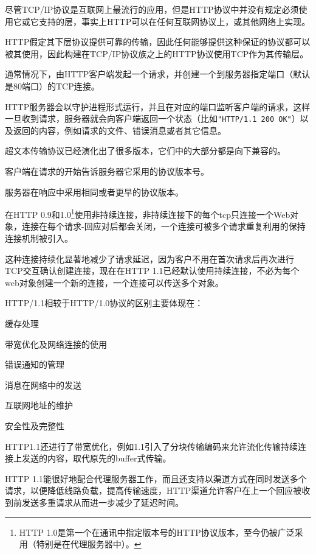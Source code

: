尽管TCP/IP协议是互联网上最流行的应用，但是HTTP协议中并没有规定必须使用它或它支持的层，事实上HTTP可以在任何互联网协议上，或其他网络上实现。

HTTP假定其下层协议提供可靠的传输，因此任何能够提供这种保证的协议都可以被其使用，因此构建在TCP/IP协议族之上的HTTP协议使用TCP作为其传输层。

通常情况下，由HTTP客户端发起一个请求，并创建一个到服务器指定端口（默认是80端口）的TCP连接。

HTTP服务器会以守护进程形式运行，并且在对应的端口监听客户端的请求，这样一旦收到请求，服务器就会向客户端返回一个状态（比如\texttt{"HTTP/1.1 200 OK"}）以及返回的内容，例如请求的文件、错误消息或者其它信息。


超文本传输协议已经演化出了很多版本，它们中的大部分都是向下兼容的。

\begin{compactitem}
\item 客户端在请求的开始告诉服务器它采用的协议版本号。

\item 服务器在响应中采用相同或者更早的协议版本。
\end{compactitem}


在HTTP 0.9和1.0\footnote{HTTP 1.0是第一个在通讯中指定版本号的HTTP协议版本，至今仍被广泛采用（特别是在代理服务器中）。}使用非持续连接，非持续连接下的每个tcp只连接一个Web对象，连接在每个请求-回应对后都会关闭，一个连接可被多个请求重复利用的保持连接机制被引入。

这种连接持续化显著地减少了请求延迟，因为客户不用在首次请求后再次进行TCP交互确认创建连接，现在在HTTP 1.1已经默认使用持续连接，不必为每个web对象创建一个新的连接，一个连接可以传送多个对象。 



HTTP/1.1相较于HTTP/1.0协议的区别主要体现在：

\begin{compactitem}
\item 缓存处理
\item 带宽优化及网络连接的使用
\item 错误通知的管理
\item 消息在网络中的发送
\item 互联网地址的维护
\item 安全性及完整性
\end{compactitem}

HTTP1.1还进行了带宽优化，例如1.1引入了分块传输编码来允许流化传输持续连接上发送的内容，取代原先的buffer式传输。

HTTP 1.1能很好地配合代理服务器工作，而且还支持以渠道方式在同时发送多个请求，以便降低线路负载，提高传输速度，HTTP渠道允许客户在上一个回应被收到前发送多重请求从而进一步减少了延迟时间。

